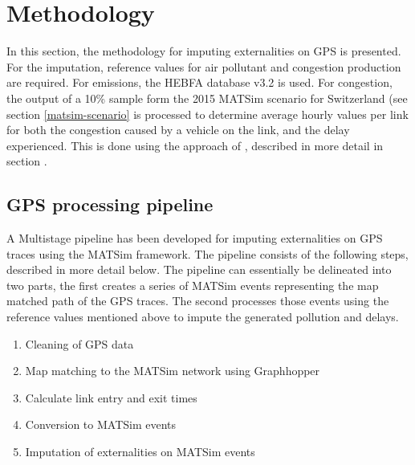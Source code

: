 \section{Methodology}

In this section, the methodology for imputing externalities on GPS is presented. For the imputation, reference values for air pollutant and congestion production are required. For emissions, the HEBFA database v3.2 is used. 
For congestion, the output of a 10\% sample form the 2015 MATSim scenario for Switzerland (see section \ref{matsim-scenario} is processed to determine average hourly values per link for both the congestion caused by a vehicle on the link, and the delay experienced. 
This is done using the approach of \citet{kaddoura}, described in more detail in section \cite{section:kaddoura_congestion_approach}.

\subsection{GPS processing pipeline}


 A Multistage pipeline has been developed for imputing externalities on GPS traces using the MATSim framework. 
 The pipeline consists of the following steps, described in more detail below. 
 The pipeline can essentially be delineated into two parts, the first creates a series of MATSim events representing the map matched path of the GPS traces. 
 The second processes those events using the reference values mentioned above to impute the generated pollution and delays.

\begin{enumerate}
 	\item Cleaning of GPS data
 	\item Map matching to the MATSim network using Graphhopper
 	\item Calculate link entry and exit times
 	\item Conversion to MATSim events
	\item Imputation of externalities on MATSim events
\end{enumerate}


